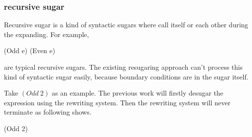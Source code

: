 \subsubsection{recursive sugar}
Recursive sugar is a kind of syntactic sugars where call itself or each other during the expanding. For example,

\begin{Codes}
(Odd e) 
(Even e) 
\end{Codes}
are typical recursive sugars. The existing resugaring approach can't process this kind of syntactic sugar easily, because boundary conditions are in the sugar itself.

Take $(Odd~2)$ as an example. The previous work will firstly desugar the expression using the rewriting system. Then the rewriting system will never terminate as following shows.
\begin{Codes}
   (Odd 2)
\end{Codes}


